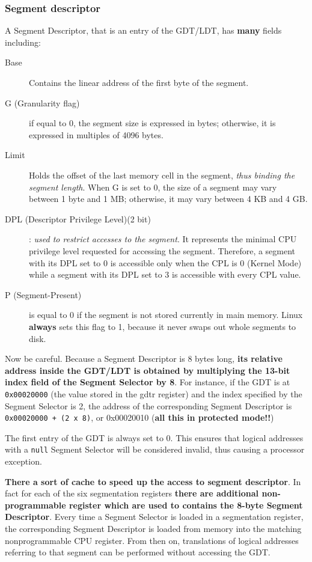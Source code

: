 \documentclass[10pt,a4paper]{article}
\begin{document}
\subsubsection{Segment descriptor}

A Segment Descriptor, that is an entry of the GDT/LDT, has \textbf{many} fields including:
\begin{description}
\item[Base] Contains the linear address of the first byte of the segment.
\item[G (Granularity flag)] if equal to 0, the segment size is expressed in bytes; otherwise, it is expressed in multiples of 4096 bytes.
\item[Limit] Holds the offset of the last memory cell in the segment, \textit{thus binding the segment length}. When G is set to 0, the size of a segment may vary between 1 byte and 1 MB; otherwise, it may vary between 4 KB and 4 GB.
\item[DPL (Descriptor Privilege Level)(2 bit)]: \textit{used to restrict accesses to the segment}. It represents the minimal CPU privilege level requested for accessing the segment. Therefore, a segment with its DPL set to 0 is accessible only when the CPL is 0 (Kernel Mode) while a segment with its DPL set to 3 is accessible with every CPL value.
\item[P (Segment-Present)] is equal to 0 if the segment is not stored currently in main memory. Linux \textbf{always} sets this flag to 1, because it never swaps out whole segments to disk.
\end{description}

Now be careful. Because a Segment Descriptor is 8 bytes long, \textbf{its relative address inside the GDT/LDT is obtained by multiplying the 13-bit index field of the Segment Selector by 8}. For instance, if the GDT is at \texttt{0x00020000} (the value stored in the gdtr register) and the index specified by the Segment Selector is 2, the address of the corresponding Segment Descriptor is \texttt{0x00020000 + (2 x 8)}, or 0x00020010 (\textbf{all this in protected mode!!})

The first entry of the GDT is always set to 0. This ensures that logical addresses with a \texttt{null} Segment Selector will be considered invalid, thus causing a processor exception. 

\textbf{There a sort of cache to speed up the access to segment descriptor}. In fact for each of the six segmentation registers \textbf{there are additional non-programmable register which are used to contains the 8-byte Segment Descriptor}.  Every time a Segment Selector is loaded in a segmentation register, the corresponding Segment Descriptor is loaded from memory into the matching nonprogrammable CPU register. From then on, translations of logical addresses referring to that segment can be performed without accessing the GDT.
\end{document}
